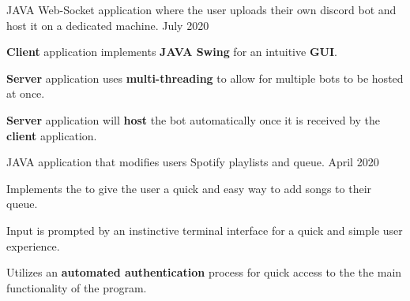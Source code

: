

\begin{cventries}

  \cventry
    {JAVA Web-Socket application where the user uploads their own discord bot and host it on a dedicated machine.} %
    {\href{https://github.com/MattBelanger321/BotHostClient}{}} %
    {July 2020} %
    {} %
    {
      \begin{cvitems} %
        \item {\textbf{Client} application implements \textbf{JAVA Swing} for an intuitive \textbf{GUI}.}
        \item {\textbf{Server} application uses \textbf{multi-threading} to allow for multiple bots to be hosted at once.}
        \item {\textbf{Server} application will \textbf{host} the bot automatically once it is received by the \textbf{client} application.}
      \end{cvitems}
    }
    
  \cventry
    {JAVA application that modifies users Spotify playlists and queue.} %
    {\href{https://github.com/MattBelanger321/SpotifyApiExample}{}} %
    {April 2020} %
    {} %
    {
      \begin{cvitems} %
        \item {Implements the \textbf{\href{http://michaelthelin.se/spotify-web-api-java/}{}} to give the user a quick and easy way to add songs to their queue.}
        \item {Input is prompted by an instinctive terminal interface for a quick and simple user experience. }
        \item{Utilizes an \textbf{automated authentication} process for quick access to the the main functionality of the program.}
      \end{cvitems}
    }
 

\end{cventries}
